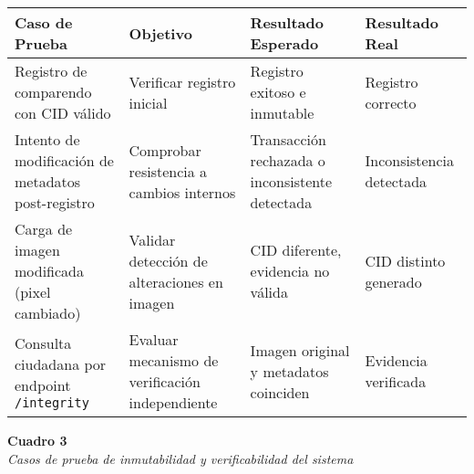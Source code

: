 \begin{center}
\begin{tabular}{|p{4cm}|p{3cm}|p{3cm}|p{3cm}|}
    \hline
    \textbf{Caso de Prueba} & \textbf{Objetivo} & \textbf{Resultado Esperado} & \textbf{Resultado Real} \\
    \hline
    Registro de comparendo con CID válido & Verificar registro inicial & Registro exitoso e inmutable & Registro correcto \\
    \hline
    Intento de modificación de metadatos post-registro & Comprobar resistencia a cambios internos & Transacción rechazada o inconsistente detectada & Inconsistencia detectada \\
    \hline
    Carga de imagen modificada (pixel cambiado) & Validar detección de alteraciones en imagen & CID diferente, evidencia no válida & CID distinto generado \\
    \hline
    Consulta ciudadana por endpoint \texttt{/integrity} & Evaluar mecanismo de verificación independiente & Imagen original y metadatos coinciden & Evidencia verificada \\
    \hline
\end{tabular}

\vspace{1em}
\noindent\textbf{Cuadro 3}\\[2em]
\textit{Casos de prueba de inmutabilidad y verificabilidad del sistema}
\end{center} 
